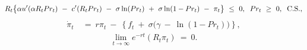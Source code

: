 \begin{equation}
\begin{split}
    & R_{t} \big\{ \alpha u'(\alpha R_{t} Pr_{t}) \ - \ c'(R_{t} Pr_{t}) \ - \ \sigma \ln(Pr_{t}) \ + \ \sigma \ln(1 - Pr_{t}) \ - \ \pi_{t} \big\} \ \leq \ 0, \hspace{0.2cm} Pr_{t} \ \geq \ 0,  \hspace{0.2cm} \text{C.S.}, \\
\end{split}
\label{Equation:Social-Planners-Problem_Necessary-Conditions_Drilling-Probability}
\end{equation}
\begin{equation}
\begin{split}
    \dot{\pi}_{t} \ 
    & = \ r \pi_{t} \ - \ \left\{ f_{t} \ + \ \sigma \big( \gamma \ - \ \ln(1 - Pr_{t}) \big) \right\},
\end{split}
\label{Equation:Social-Planners-Problem_Necessary-Conditions_Costate-Variable}
\end{equation}
\begin{equation}
\begin{split}
    \lim_{t \rightarrow \infty} e^{-rt} (R_{t} \pi_{t}) \ = \ 0.
\end{split}
\label{Equation:Social-Planners-Problem_Transversality-Condition}
\end{equation}